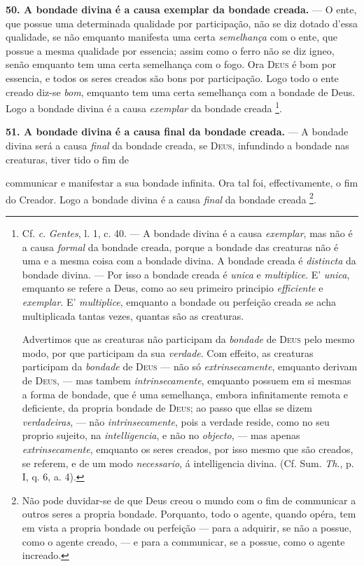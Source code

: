 \textbf{50. A bondade divina é a causa exemplar da bondade creada.} --- O ente, que possue uma determinada qualidade por participação, não se diz dotado d'essa qualidade, se não emquanto manifesta uma certa \emph{semelhança} com o ente, que possue a mesma qualidade por essencia; assim como o ferro não se diz igneo, senão emquanto tem uma certa semelhança com o fogo. Ora \textsc{Deus} é bom por essencia, e todos os seres creados são bons por participação. Logo todo o ente creado diz-se \emph{bom}, emquanto tem uma certa semelhança com a bondade de Deus. Logo a bondade divina é a causa \emph{exemplar} da bondade creada \footnote{Cf. \emph{c}. \emph{Gentes}, l. 1, c. 40. --- A bondade divina é a causa \emph{exemplar}, mas não é a causa \emph{formal} da bondade creada, porque a bondade das creaturas não é uma e a mesma coisa com a bondade divina. A bondade creada é \emph{distincta} da bondade divina. --- Por isso a bondade creada é \emph{unica} e \emph{multiplice}. E' \emph{unica}, emquanto se refere a Deus, como ao seu primeiro principio \emph{efficiente} e \emph{exemplar}. E' \emph{multiplice}, emquanto a bondade ou perfeição creada se acha multiplicada tantas vezes, quantas são as creaturas.\par Advertimos que as creaturas não participam da \emph{bondade} de \textsc{Deus} pelo mesmo modo, por que participam da sua \emph{verdade}. Com effeito, as creaturas participam da \emph{bondade} de \textsc{Deus} --- não só \emph{extrinsecamente}, emquanto derivam de \textsc{Deus}, --- mas tambem \emph{intrinsecamente}, emquanto possuem em si mesmas a forma de bondade, que é uma semelhança, embora infinitamente remota e deficiente, da propria bondade de \textsc{Deus}; ao passo que ellas se dizem \emph{verdadeiras}, --- não \emph{intrinsecamente}, pois a verdade reside, como no seu proprio sujeito, na \emph{intelligencia}, e não no \emph{objecto}, --- mas apenas \emph{extrinsecamente}, emquanto os seres creados, por isso mesmo que são creados, se referem, e de um modo \emph{necessario}, á intelligencia divina. (Cf. Sum. \emph{Th}., p. I, q. 6, a. 4).}.

\textbf{51. A bondade divina é a causa final da bondade creada.} --- A bondade divina será a causa \emph{final} da bondade creada, se \textsc{Deus}, infundindo a bondade nas creaturas, tiver tido o fim de

 communicar e manifestar a sua bondade infinita. Ora tal foi, effectivamente, o fim do Creador. Logo a bondade divina é a causa \emph{final} da bondade creada \footnote{Não pode duvidar-se de que Deus creou o mundo com o fim de communicar a outros seres a propria bondade. Porquanto, todo o agente, quando opéra, tem em vista a propria bondade ou perfeição --- para a adquirir, se não a possue, como o agente creado, --- e para a communicar, se a possue, como o agente increado.}.

